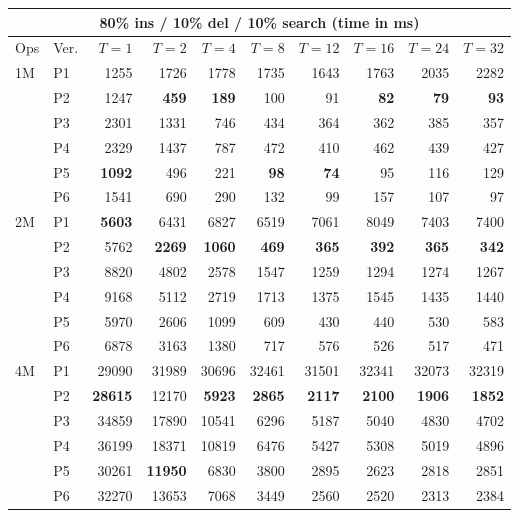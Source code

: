 \begin{tabular}{llrrrrrrrr}
\toprule
\multicolumn{10}{c}{\textbf{80\% ins / 10\% del / 10\% search} (time in ms)} \\
\midrule
Ops & Ver. & $T{=}1$ & $T{=}2$ & $T{=}4$ & $T{=}8$ & $T{=}12$ & $T{=}16$ & $T{=}24$ & $T{=}32$ \\
\midrule
1M & P1 & 1255 & 1726 & 1778 & 1735 & 1643 & 1763 & 2035 & 2282 \\
 & P2 & 1247 & \textbf{459} & \textbf{189} & 100 & 91 & \textbf{82} & \textbf{79} & \textbf{93} \\
 & P3 & 2301 & 1331 & 746 & 434 & 364 & 362 & 385 & 357 \\
 & P4 & 2329 & 1437 & 787 & 472 & 410 & 462 & 439 & 427 \\
 & P5 & \textbf{1092} & 496 & 221 & \textbf{98} & \textbf{74} & 95 & 116 & 129 \\
 & P6 & 1541 & 690 & 290 & 132 & 99 & 157 & 107 & 97 \\
\midrule
2M & P1 & \textbf{5603} & 6431 & 6827 & 6519 & 7061 & 8049 & 7403 & 7400 \\
 & P2 & 5762 & \textbf{2269} & \textbf{1060} & \textbf{469} & \textbf{365} & \textbf{392} & \textbf{365} & \textbf{342} \\
 & P3 & 8820 & 4802 & 2578 & 1547 & 1259 & 1294 & 1274 & 1267 \\
 & P4 & 9168 & 5112 & 2719 & 1713 & 1375 & 1545 & 1435 & 1440 \\
 & P5 & 5970 & 2606 & 1099 & 609 & 430 & 440 & 530 & 583 \\
 & P6 & 6878 & 3163 & 1380 & 717 & 576 & 526 & 517 & 471 \\
\midrule
4M & P1 & 29090 & 31989 & 30696 & 32461 & 31501 & 32341 & 32073 & 32319 \\
 & P2 & \textbf{28615} & 12170 & \textbf{5923} & \textbf{2865} & \textbf{2117} & \textbf{2100} & \textbf{1906} & \textbf{1852} \\
 & P3 & 34859 & 17890 & 10541 & 6296 & 5187 & 5040 & 4830 & 4702 \\
 & P4 & 36199 & 18371 & 10819 & 6476 & 5427 & 5308 & 5019 & 4896 \\
 & P5 & 30261 & \textbf{11950} & 6830 & 3800 & 2895 & 2623 & 2818 & 2851 \\
 & P6 & 32270 & 13653 & 7068 & 3449 & 2560 & 2520 & 2313 & 2384 \\
\bottomrule
\end{tabular}
\vspace{1em}

